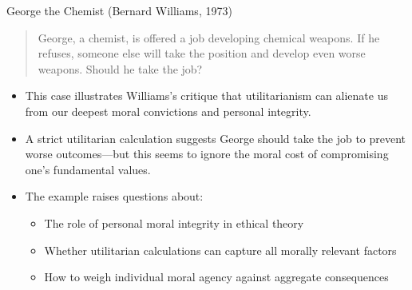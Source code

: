 \documentclass[aspectratio=169]{beamer}
\begin{document}
\begin{frame}{George the Chemist (Bernard Williams, 1973)}
    \begin{quote}
        George, a chemist, is offered a job developing chemical weapons. If he refuses, someone else will take the position and develop even worse weapons. Should he take the job?
    \end{quote}
    \begin{itemize}
        \item This case illustrates Williams's critique that utilitarianism can alienate us from our deepest moral convictions and personal integrity.
        
        \item A strict utilitarian calculation suggests George should take the job to prevent worse outcomes—but this seems to ignore the moral cost of compromising one's fundamental values.
        
        \item The example raises questions about:
            \begin{itemize}
                \item The role of personal moral integrity in ethical theory
                \item Whether utilitarian calculations can capture all morally relevant factors
                \item How to weigh individual moral agency against aggregate consequences
            \end{itemize}
    \end{itemize}
\end{frame}
\end{document}
